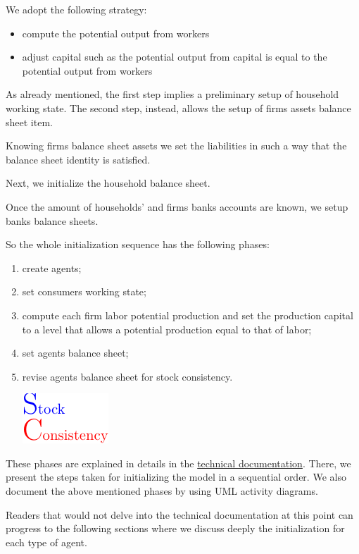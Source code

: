 \documentclass{book}
\newcommand{\doclocation}{file:///Users/giulioni/Documents/workspace/gabriele/docs}
\begin{document}
We adopt the following strategy: 
\begin{itemize}
	\item compute the potential output from workers
	\item adjust capital such as the potential output from capital is equal to the potential output from workers 
\end{itemize}

As already mentioned, the first step implies a preliminary setup of household working state. The second step, instead, allows the setup of firms assets balance sheet item. 

Knowing firms balance sheet assets we set the liabilities in such a way that the balance sheet identity is satisfied.

Next, we initialize the household balance sheet.

Once the amount of households' and firms banks accounts are known, we setup banks balance sheets.

So the whole initialization sequence has the following phases:
\begin{enumerate}
	\item create agents;
	\item set consumers working state;
	\item compute each firm labor potential production and set the production capital to a level that allows a potential production equal to that of labor;
	\item set agents balance sheet;
	\item revise agents balance sheet for stock consistency.\begin{marginfigure}
	\hskip1cm\includegraphics[scale=1.0]{sc_logo-0.pdf}
\end{marginfigure}

\end{enumerate}

These phases are explained in details in the \href{\doclocation/index_initialization.html}{technical documentation}. There, we present the steps taken for initializing the model in a sequential order. We also document the above mentioned phases by using UML activity diagrams.

Readers that would not delve into the technical documentation at this point can progress to the following sections where we discuss deeply the initialization for each type of agent.
\end{document}
